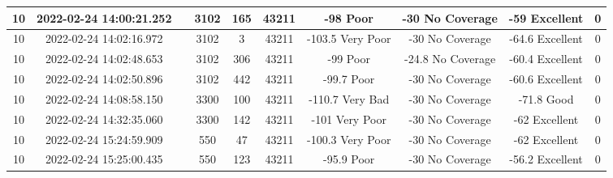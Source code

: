 \begin{longtable*}{|c|c|c|c|c|c|c|c|c|c|}
10&2022-02-24 14:00:21.252&&3102&165&43211& -98       Poor        & -30       No Coverage & -59       Excellent   & 0\\\hline
{}10&2022-02-24 14:02:16.972&&3102&3&43211& -103.5    Very Poor   & -30       No Coverage & -64.6     Excellent   & 0\\\hline
{}10&2022-02-24 14:02:48.653&&3102&306&43211& -99       Poor        & -24.8     No Coverage & -60.4     Excellent   & 0\\\hline
{}10&2022-02-24 14:02:50.896&&3102&442&43211& -99.7     Poor        & -30       No Coverage & -60.6     Excellent   & 0\\\hline
{}10&2022-02-24 14:08:58.150&&3300&100&43211& -110.7    Very Bad    & -30       No Coverage & -71.8     Good        & 0\\\hline
{}10&2022-02-24 14:32:35.060&&3300&142&43211& -101      Very Poor   & -30       No Coverage & -62       Excellent   & 0\\\hline
{}10&2022-02-24 15:24:59.909&&550&47&43211& -100.3    Very Poor   & -30       No Coverage & -62       Excellent   & 0\\\hline
{}10&2022-02-24 15:25:00.435&&550&123&43211& -95.9     Poor        & -30       No Coverage & -56.2     Excellent   & 0\\\hline

\end{longtable*}
